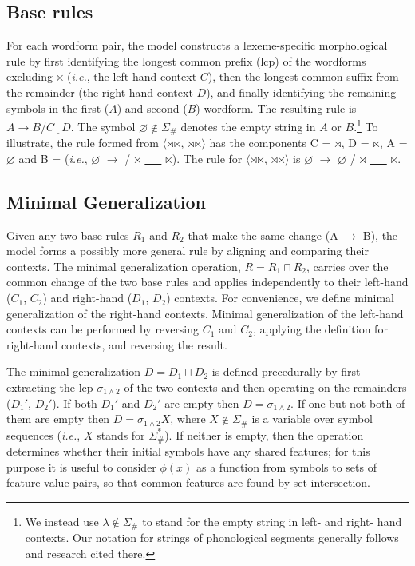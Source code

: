 \documentclass[11pt]{article}
\begin{document}
\subsection{Base rules}

For each wordform pair, the model constructs a lexeme-specific morphological rule by first identifying the longest common prefix (lcp) of the wordforms excluding $\ltimes$ (\emph{i.e.}, the left-hand context $C$), then the longest common suffix from the remainder (the right-hand context $D$), and finally identifying the remaining symbols in the first ($A$) and second ($B$) wordform. The resulting rule is $A \to B / C \underline{\ \ \ } D$. The symbol $\varnothing \notin \Sigma_{\#}$ denotes the empty string in $A$ or $B$.\footnote{We instead use $\lambda \notin \Sigma_{\#}$ to stand for the empty string in left- and right- hand contexts. Our notation for strings of phonological segments generally follows \citet{chandlee2017} and research cited there.} To illustrate, the rule formed from $\langle$$\rtimes$$\ltimes$, $\rtimes$$\ltimes$$\rangle$ has the components C = $\rtimes$, D = $\ltimes$, A = $\varnothing$ and B =  (\emph{i.e.}, $\varnothing$ $\to$  / $\rtimes$ \underline{\ \ \ } $\ltimes$). The rule for $\langle$$\rtimes$$\ltimes$, $\rtimes$$\ltimes$$\rangle$ is $\varnothing$ $\to$ $\varnothing$ / $\rtimes$ \underline{\ \ \ } $\ltimes$.

\subsection{Minimal Generalization}
\label{sec:mingenop}
Given any two base rules $R_1$ and $R_2$ that make the same change (A $\to$ B), the model forms a possibly more general rule by aligning and comparing their contexts. The minimal generalization operation, $R = R_1 \sqcap R_2$, carries over the common change of the two base rules and applies independently to their left-hand ($C_1$, $C_2$) and right-hand ($D_1$, $D_2$) contexts. For convenience, we define minimal generalization of the right-hand contexts. Minimal generalization of the left-hand contexts can be performed by reversing $C_1$ and $C_2$, applying the definition for right-hand contexts, and reversing the result.

The minimal generalization $D = D_1 \sqcap D_2$ is defined precedurally by first extracting the lcp $\sigma_{1\land2}$ of the two contexts and then operating on the remainders ($D_1'$, $D_2'$). If both $D_1'$ and $D_2'$ are empty then $D = \sigma_{1\land2}$. If one but not both of them are empty then $D = \sigma_{1\land2}X$, where $X \notin \Sigma_{\#}$ is a variable over symbol sequences (\emph{i.e.}, $X$ stands for $\Sigma_{\#}^*$). If neither is empty, then the operation determines whether their initial symbols have any shared features; for this purpose it is useful to consider $\phi(x)$ as a function from symbols to sets of feature-value pairs, so that common features are found by set intersection.
\end{document}
